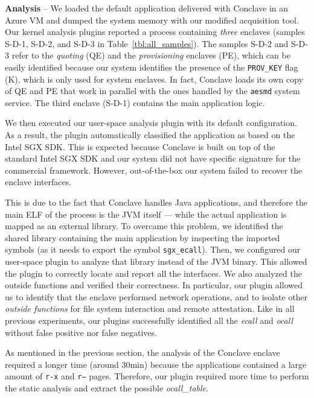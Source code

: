 \vspace{0.2cm}
\noindent \textbf{Analysis} --
We loaded the default application delivered with Conclave in an Azure VM and
dumped the system memory with our modified acquisition tool.
Our kernel analysis plugins reported a process containing \emph{three} 
enclaves (samples S-D-1, S-D-2, and S-D-3 in 
Table~\ref{tbl:all_samples}).
The samples S-D-2 and S-D-3 refer to the \emph{quoting} (QE) and the
\emph{provisioning} enclaves (PE), which can be easily identified 
because our system identifies the presence of the \texttt{PROV\_KEY} flag 
(K), which is only used for system enclaves.
In fact, Conclave loads its own copy of QE and PE that work in parallel with 
the ones handled by the \texttt{aesmd} system service.
The third enclave (S-D-1) contains the main application logic.

We then executed our user-space analysis plugin with its default configuration.
As a result, the plugin automatically classified the application as based on 
the Intel
SGX SDK.
This is expected because Conclave is built on top of the standard Intel SGX SDK
and our system did not have specific signature for the commercial framework.
However, out-of-the-box our system failed to recover the enclave interfaces.

This is due to the fact that Conclave handles Java applications, and
therefore the main ELF of the process is the JVM itself --- while the
actual application is mapped as an external library.
To overcame this problem, we identified the shared library containing the main
application by inspecting the imported symbols (as it needs to export the 
symbol \texttt{sgx\_ecall}).
Then, we configured our user-space plugin to analyze that library instead of 
the JVM binary.
This allowed the plugin to correctly locate and report all the interfaces. We 
also analyzed the
outside functions and verified their correctness.
In particular, our plugin allowed us to identify that the enclave performed 
network operations, and to
isolate other \emph{outside functions} for file system interaction
and remote attestation.
Like in all previous experiments, our plugins successfully identified all the 
\emph{ecall}
and \emph{ocall} without false positive nor false negatives.

As mentioned in the previous section, the analysis of the Conclave enclave 
required a
longer time (around $30$min) because the applications contained a large amount
of \texttt{r-x} and \texttt{r--} pages. Therefore, our plugin required more
time to perform the static analysis and extract the possible 
\emph{ocall\_table}.

